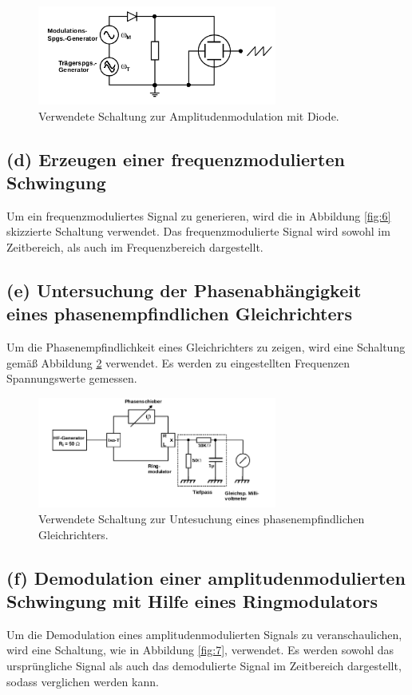 \begin{figure}
  \centering
  \includegraphics[width=0.7\textwidth]{figures/c_d.png}
  \caption{Verwendete Schaltung zur Amplitudenmodulation mit Diode.\cite{sample}}
  \label{fig:14}
\end{figure}


\FloatBarrier
\subsection{(d) Erzeugen einer frequenzmodulierten Schwingung}
\label{subsec:durchfuehrung_d}
Um ein frequenzmoduliertes Signal zu generieren, wird die in Abbildung
\ref{fig:6} skizzierte Schaltung verwendet.
Das frequenzmodulierte Signal wird sowohl im Zeitbereich, als auch
im Frequenzbereich dargestellt.


\FloatBarrier
\subsection{(e) Untersuchung der Phasenabhängigkeit eines
phasenempfindlichen Gleichrichters}
\label{subsec:durchfuehrung_e}
Um die Phasenempfindlichkeit eines Gleichrichters zu zeigen,
wird eine Schaltung gemäß Abbildung \ref{fig:15} verwendet.
Es werden zu eingestellten Frequenzen Spannungswerte gemessen.

\begin{figure}
  \centering
  \includegraphics[width=0.7\textwidth]{figures/e_d.png}
  \caption{Verwendete Schaltung zur Untesuchung eines phasenempfindlichen Gleichrichters.\cite{sample}}
  \label{fig:15}
\end{figure}


\FloatBarrier
\subsection{(f) Demodulation einer amplitudenmodulierten Schwingung
mit Hilfe eines Ringmodulators}
\label{subsec:durchfuehrung_f}
Um die Demodulation eines amplitudenmodulierten Signals zu veranschaulichen,
wird eine Schaltung, wie in Abbildung \ref{fig:7},
verwendet. Es werden sowohl das ursprüngliche Signal als auch das
demodulierte Signal im Zeitbereich dargestellt, sodass verglichen werden kann.



